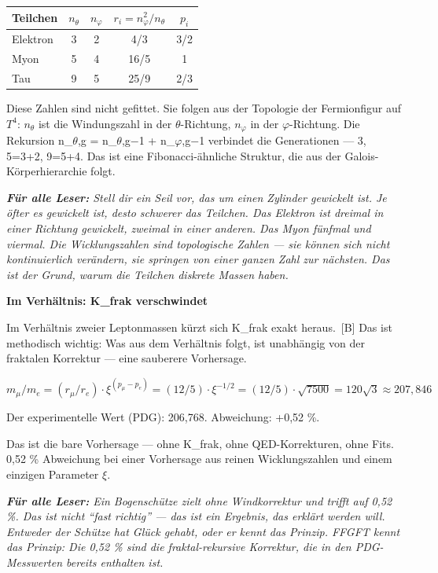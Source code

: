 \documentclass[11pt,oneside]{book}
\newcommand{\status}[1]{\penalty10000\,{\scriptsize\textcolor{gray!60}{[#1]}}}
\newenvironment{laierspur}{%
  \par\vspace{4pt}%
  \noindent\small\itshape\color{blue!60!black}%
  \textbf{Für alle Leser:}\enspace\ignorespaces}{%
  \par\vspace{4pt}\normalsize\normalfont\normalcolor}
\begin{document}
\begin{center}
\small
\begin{tabular}{lcccc}
\toprule
Teilchen & $n_\theta$ & $n_\varphi$ & $r_i = n_\varphi^2/n_\theta$ & $p_i$ \\
\midrule
Elektron & 3 & 2 & 4/3 & 3/2 \\
Myon & 5 & 4 & 16/5 & 1 \\
Tau & 9 & 5 & 25/9 & 2/3 \\
\bottomrule
\end{tabular}
\end{center}

Diese Zahlen sind nicht gefittet. Sie folgen aus der Topologie der
Fermionfigur auf $T^4$: $n_\theta$ ist die Windungszahl in der $\theta$-Richtung, $n_\varphi$
in der $\varphi$-Richtung. Die Rekursion n\_{$\theta$,g} = n\_{$\theta$,g$-$1} + n\_{$\varphi$,g$-$1}
verbindet die Generationen — 3, 5=3+2, 9=5+4. Das ist eine
Fibonacci-ähnliche Struktur, die aus der Galois-Körperhierarchie folgt.


\begin{laierspur}
Stell dir ein Seil vor, das um einen Zylinder gewickelt
ist. Je öfter es gewickelt ist, desto schwerer das Teilchen. Das
Elektron ist dreimal in einer Richtung gewickelt, zweimal in einer
anderen. Das Myon fünfmal und viermal. Die Wicklungszahlen sind
topologische Zahlen — sie können sich nicht kontinuierlich verändern,
sie springen von einer ganzen Zahl zur nächsten. Das ist der Grund,
warum die Teilchen diskrete Massen haben.
\end{laierspur}

\textbf{Im Verhältnis: K\_frak verschwindet}


Im Verhältnis zweier Leptonmassen kürzt sich K\_frak exakt heraus. \status{B}
Das ist methodisch wichtig: Was aus dem Verhältnis folgt, ist unabhängig
von der fraktalen Korrektur — eine sauberere Vorhersage.


$m_\mu/m_e = (r_\mu/r_e)\cdot\xi^{(p_\mu - p_e)} = (12/5)\cdot\xi^{-1/2} = (12/5)\cdot\sqrt{7500} = 120\sqrt{3} \approx 207{,}846$


Der experimentelle Wert (PDG): 206,768. Abweichung: +0,52 \%.


Das ist die bare Vorhersage — ohne K\_frak, ohne QED-Korrekturen, ohne
Fits. 0,52 \% Abweichung bei einer Vorhersage aus reinen Wicklungszahlen
und einem einzigen Parameter $\xi$.


\begin{laierspur}
Ein Bogenschütze zielt ohne Windkorrektur und trifft auf
0,52 \%. Das ist nicht \enquote{fast richtig} — das ist ein Ergebnis, das erklärt
werden will. Entweder der Schütze hat Glück gehabt, oder er kennt das
Prinzip. FFGFT kennt das Prinzip: Die 0,52 \% sind die fraktal-rekursive
Korrektur, die in den PDG-Messwerten bereits enthalten ist.
\end{laierspur}
\end{document}
